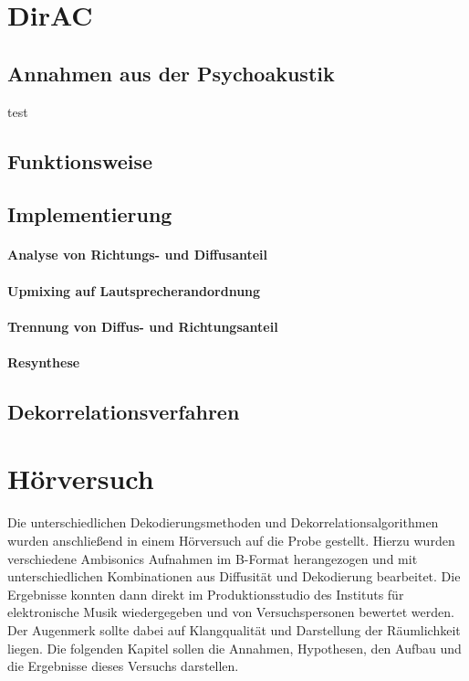\documentclass[12pt, a4paper]{article}
\begin{document}
\section{DirAC}
    \subsection{Annahmen aus der Psychoakustik}
    
    test \cite{book1}
    \subsection{Funktionsweise}
    
    \subsection{Implementierung}
    
        \paragraph{Analyse von Richtungs- und Diffusanteil}
        
        \paragraph{Upmixing auf Lautsprecherandordnung}
        
        \paragraph{Trennung von Diffus- und Richtungsanteil}
        
        \paragraph{Resynthese}
        

    \subsection{Dekorrelationsverfahren}
    


\section{Hörversuch}
Die unterschiedlichen Dekodierungsmethoden und Dekorrelationsalgorithmen wurden anschließend in einem Hörversuch auf die Probe gestellt. Hierzu wurden verschiedene Ambisonics Aufnahmen im B-Format herangezogen und mit unterschiedlichen Kombinationen aus Diffusität und Dekodierung bearbeitet. Die Ergebnisse konnten dann direkt im Produktionsstudio des Instituts für elektronische Musik wiedergegeben und von Versuchspersonen bewertet werden. Der Augenmerk sollte dabei auf Klangqualität und Darstellung der Räumlichkeit liegen. Die folgenden Kapitel sollen die Annahmen, Hypothesen, den Aufbau und die Ergebnisse dieses Versuchs darstellen.
\end{document}
